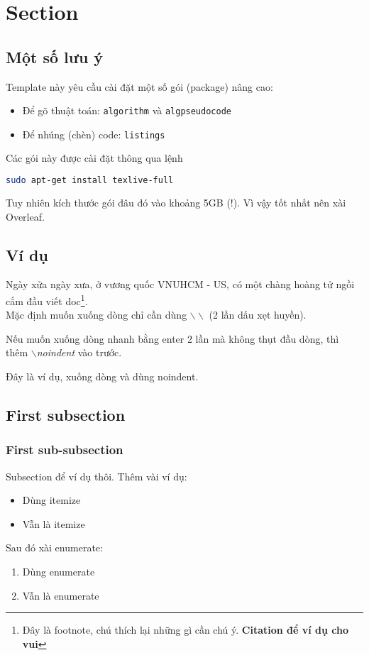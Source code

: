 \section{Section}

\subsection{Một số lưu ý}
Template này yêu cầu cài đặt một số gói (package) nâng cao:
\begin{itemize}
\item Để gõ thuật toán: \texttt{algorithm} và \texttt{algpseudocode}
\item Để nhúng (chèn) code: \texttt{listings}
\end{itemize}
Các gói này được cài đặt thông qua lệnh
\begin{lstlisting}[language=sh]
sudo apt-get install texlive-full
\end{lstlisting}
Tuy nhiên kích thước gói đâu đó vào khoảng 5GB (!). Vì vậy tốt nhất nên xài Overleaf.

\subsection{Ví dụ}
Ngày xửa ngày xưa, ở vương quốc VNUHCM - US, có một chàng hoàng tử ngồi cắm đầu viết doc\cite{greenwade93}\footnote{Đây là footnote, chú thích lại những gì cần chú ý. \textbf{Citation để ví dụ cho vui}}.\\
Mặc định muốn xuống dòng chỉ cần dùng $\backslash\backslash$  (2 lần dấu xẹt huyền). 

Nếu muốn xuống dòng nhanh bằng enter 2 lần mà không thụt đầu dòng, thì thêm \textit{$\backslash$noindent} vào trước.

\noindent Đây là ví dụ, xuống dòng và dùng noindent.

\subsection{First subsection}
\subsubsection{First sub-subsection}
Subsection để ví dụ thôi. Thêm vài ví dụ:
\begin{itemize}
    \item Dùng itemize
    \item Vẫn là itemize
\end{itemize}
Sau đó xài enumerate:
\begin{enumerate}
    \item Dùng enumerate
    \item Vẫn là enumerate
\end{enumerate}
